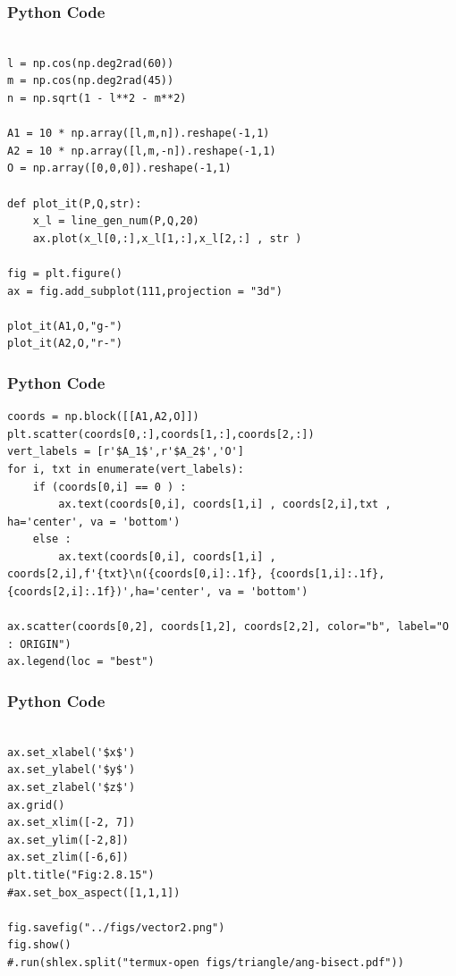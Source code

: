 \documentclass{beamer}
\begin{document}
\begin{frame}[fragile]
    \frametitle{Python Code }
    \begin{lstlisting}

l = np.cos(np.deg2rad(60))
m = np.cos(np.deg2rad(45))
n = np.sqrt(1 - l**2 - m**2)

A1 = 10 * np.array([l,m,n]).reshape(-1,1)
A2 = 10 * np.array([l,m,-n]).reshape(-1,1)
O = np.array([0,0,0]).reshape(-1,1)

def plot_it(P,Q,str):
    x_l = line_gen_num(P,Q,20)
    ax.plot(x_l[0,:],x_l[1,:],x_l[2,:] , str )

fig = plt.figure()
ax = fig.add_subplot(111,projection = "3d")

plot_it(A1,O,"g-")
plot_it(A2,O,"r-")

\end{lstlisting}
\end{frame}

\begin{frame}[fragile]
    \frametitle{Python Code }
    \begin{lstlisting}
coords = np.block([[A1,A2,O]])
plt.scatter(coords[0,:],coords[1,:],coords[2,:])
vert_labels = [r'$A_1$',r'$A_2$','O']
for i, txt in enumerate(vert_labels):
    if (coords[0,i] == 0 ) :
        ax.text(coords[0,i], coords[1,i] , coords[2,i],txt , ha='center', va = 'bottom')
    else :
        ax.text(coords[0,i], coords[1,i] , coords[2,i],f'{txt}\n({coords[0,i]:.1f}, {coords[1,i]:.1f}, {coords[2,i]:.1f})',ha='center', va = 'bottom')

ax.scatter(coords[0,2], coords[1,2], coords[2,2], color="b", label="O : ORIGIN")
ax.legend(loc = "best")
\end{lstlisting}
\end{frame}


\begin{frame}[fragile]
    \frametitle{Python Code }
    \begin{lstlisting}

ax.set_xlabel('$x$')
ax.set_ylabel('$y$')
ax.set_zlabel('$z$')
ax.grid()
ax.set_xlim([-2, 7])
ax.set_ylim([-2,8])
ax.set_zlim([-6,6])
plt.title("Fig:2.8.15")
#ax.set_box_aspect([1,1,1])

fig.savefig("../figs/vector2.png")
fig.show()
#.run(shlex.split("termux-open figs/triangle/ang-bisect.pdf"))

    \end{lstlisting}
\end{frame}
\end{document}
